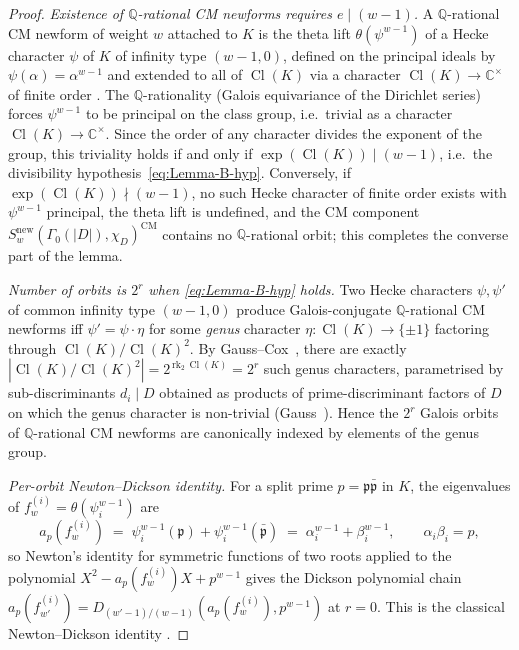 \documentclass[11pt,a4paper]{amsart}
\theoremstyle{plain}
\theoremstyle{definition}
\DeclareMathOperator{\Cl}{Cl}
\newcommand{\Q}{\mathbb{Q}}
\newcommand{\C}{\mathbb{C}}
\newcommand{\absD}{\lvert D\rvert}
\newcommand{\fl}[2]{f_{#1}^{(#2)}}
\begin{document}
\begin{proof}
\emph{Existence of $\Q$-rational CM newforms requires
$e \mid (w-1)$.} A $\Q$-rational CM newform of weight $w$ attached to $K$
is the theta lift $\theta(\psi^{w-1})$ of a Hecke character $\psi$ of
$K$ of infinity type $(w-1, 0)$, defined on the principal ideals by
$\psi(\alpha) = \alpha^{w-1}$ and extended to all of $\Cl(K)$ via a
character $\Cl(K) \to \C^\times$ of finite order
\cite[\S 7.6]{Shimura1971}. The
$\Q$-rationality (Galois equivariance of the Dirichlet series) forces
$\psi^{w-1}$ to be principal on the class group, i.e.\ trivial as a
character $\Cl(K) \to \C^\times$. Since the order of any character
divides the exponent of the group, this triviality holds if and only if
$\exp(\Cl(K)) \mid (w-1)$, i.e.~the divisibility
hypothesis~\eqref{eq:Lemma-B-hyp}. Conversely, if
$\exp(\Cl(K)) \nmid (w-1)$, no such Hecke character of finite order
exists with $\psi^{w-1}$ principal, the theta lift is undefined, and
the CM component
$S_w^{\mathrm{new}}(\Gamma_0(\absD), \chi_D)^{\mathrm{CM}}$ contains no
$\Q$-rational orbit; this completes the converse part of the lemma.

\emph{Number of orbits is $2^r$ when \eqref{eq:Lemma-B-hyp} holds.}
Two Hecke characters $\psi, \psi'$ of common infinity type
$(w-1, 0)$ produce Galois-conjugate $\Q$-rational CM newforms iff
$\psi' = \psi \cdot \eta$ for some \emph{genus} character
$\eta : \Cl(K) \to \{\pm 1\}$ factoring through $\Cl(K)/\Cl(K)^2$.
By Gauss--Cox~\cite[Thm.~6.1]{Cox1989}, there are exactly
$|\Cl(K)/\Cl(K)^2| = 2^{\,\mathrm{rk}_2\,\Cl(K)} = 2^r$ such genus
characters, parametrised by sub-discriminants $d_i \mid D$ obtained as
products of prime-discriminant factors of $D$ on which the genus
character is non-trivial (Gauss~\cite[\S\S 232--235]{Gauss1801}).
Hence the $2^r$ Galois orbits of $\Q$-rational CM newforms are
canonically indexed by elements of the genus group.

\emph{Per-orbit Newton--Dickson identity.}
For a split prime $p = \mathfrak{p}\bar{\mathfrak{p}}$ in $K$, the
eigenvalues of $\fl{w}{i} = \theta(\psi_i^{w-1})$ are
\[
   a_p(\fl{w}{i}) \;=\; \psi_i^{w-1}(\mathfrak{p})
     + \psi_i^{w-1}(\bar{\mathfrak{p}})
     \;=\; \alpha_i^{w-1} + \beta_i^{w-1},
   \qquad \alpha_i \beta_i = p,
\]
so Newton's identity for symmetric functions of two roots
applied to the polynomial $X^2 - a_p(\fl{w}{i}) X + p^{w-1}$ gives the
Dickson polynomial chain
$a_p(\fl{w'}{i}) = D_{(w'-1)/(w-1)}(a_p(\fl{w}{i}), p^{w-1})$ at
$r = 0$.  This is the classical Newton--Dickson identity
\cite[Ch.~2]{Lidl1993}.


\end{proof}
\end{document}
